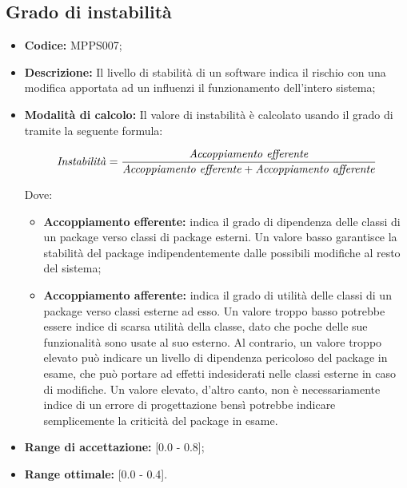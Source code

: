 \documentclass[openany,12pt,a4paper]{report}
\begin{document}
\subsection{Grado di instabilità}

\begin{itemize}
    \item \textbf{Codice:} MPPS007;
    
    \item \textbf{Descrizione:} Il livello di stabilità di un software indica il rischio con una modifica apportata ad un  influenzi il funzionamento dell'intero sistema;
    
    \item \textbf{Modalità di calcolo:} Il valore di instabilità è calcolato usando il grado di  tramite la seguente formula:
    
    \[ \textrm{\textit{Instabilità}} = \frac{\textrm{\textit{Accoppiamento efferente}}}{\textrm{\textit{Accoppiamento efferente}} + \textrm{\textit{Accoppiamento afferente}}} \]
    
    Dove:
    
    \begin{itemize}
        \item \textbf{Accoppiamento efferente:} indica il grado di dipendenza delle classi di un package verso classi di package esterni. Un valore basso garantisce la stabilità del package indipendentemente dalle possibili modifiche al resto del sistema;
        
        \item \textbf{Accoppiamento afferente:} indica il grado di utilità delle classi di un package verso classi esterne ad esso. Un valore troppo basso potrebbe essere indice di scarsa utilità della classe, dato che poche delle sue funzionalità sono usate al suo esterno. Al contrario, un valore troppo elevato può indicare un livello di dipendenza pericoloso del package in esame, che può portare ad effetti indesiderati nelle classi esterne in caso di modifiche. Un valore elevato, d'altro canto, non è necessariamente indice di un errore di progettazione bensì potrebbe indicare semplicemente la criticità del package in esame.
    \end{itemize}
    
    \item \textbf{Range di accettazione:} [0.0 - 0.8];
    \item \textbf{Range ottimale:} [0.0 - 0.4].

\end{itemize}
\end{document}
